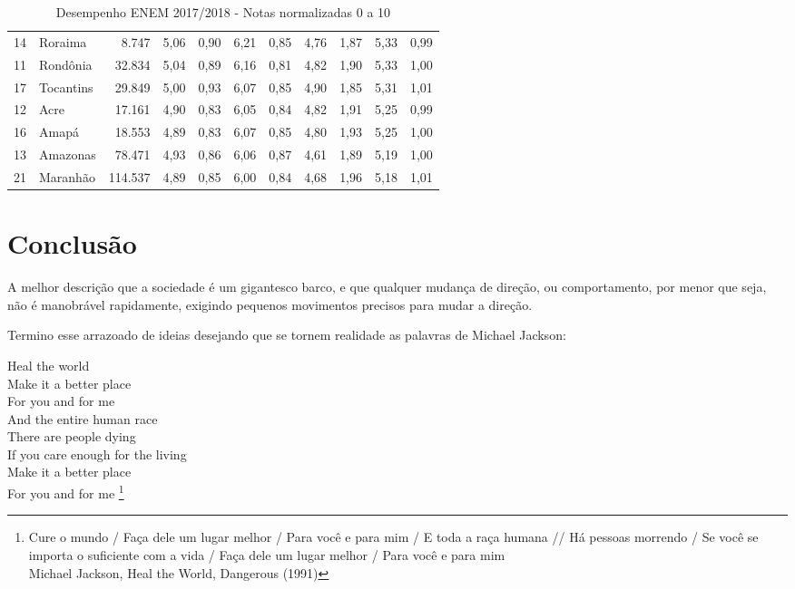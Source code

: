 \begin{table}[]
{\begin{tabular}{llrrrrrrrrr}
            14 & Roraima             & 8.747   & 5,06 & 0,90 & 6,21 & 0,85 & 4,76 & 1,87 & 5,33 & 0,99 \\
            \rowcolor[HTML]{DCE6F1}
            11 & Rondônia            & 32.834  & 5,04 & 0,89 & 6,16 & 0,81 & 4,82 & 1,90 & 5,33 & 1,00 \\
            17 & Tocantins           & 29.849  & 5,00 & 0,93 & 6,07 & 0,85 & 4,90 & 1,85 & 5,31 & 1,01 \\
            \rowcolor[HTML]{DCE6F1}
            12 & Acre                & 17.161  & 4,90 & 0,83 & 6,05 & 0,84 & 4,82 & 1,91 & 5,25 & 0,99 \\
            16 & Amapá               & 18.553  & 4,89 & 0,83 & 6,07 & 0,85 & 4,80 & 1,93 & 5,25 & 1,00 \\
            \rowcolor[HTML]{DCE6F1}
            13 & Amazonas            & 78.471  & 4,93 & 0,86 & 6,06 & 0,87 & 4,61 & 1,89 & 5,19 & 1,00 \\
            21 & Maranhão            & 114.537 & 4,89 & 0,85 & 6,00 & 0,84 & 4,68 & 1,96 & 5,18 & 1,01
        \end{tabular}
    }
    \caption{ Desempenho ENEM 2017/2018 - Notas normalizadas 0 a 10}
    \label{table:ENEM}
\end{table}



\section{Conclusão}

A melhor descrição que a sociedade é um gigantesco barco, e que qualquer mudança de direção, ou comportamento, por menor que seja, não é manobrável rapidamente, exigindo pequenos movimentos precisos para mudar a direção.


Termino esse arrazoado de ideias desejando que se tornem realidade as palavras de Michael Jackson:

\begin{citacao}
    Heal the world\\
    Make it a better place\\
    For you and for me\\
    And the entire human race\\

    There are people dying\\
    If you care enough for the living\\
    Make it a better place\\
    For you and for me \footnote{
        Cure o mundo / Faça dele um lugar melhor / Para você e para mim / E toda a raça humana //
        Há pessoas morrendo / Se você se importa o suficiente com a vida / Faça dele um lugar melhor / Para você e para mim \\
        Michael Jackson, Heal the World, Dangerous (1991)
    }
\end{citacao}
